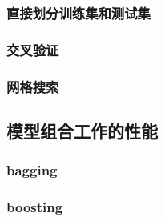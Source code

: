 \documentclass[12pt,a4paper]{article}
\theoremstyle{definition}
\begin{document}
\subsubsection{直接划分训练集和测试集}

\subsubsection{交叉验证}

\subsubsection{网格搜索}

\subsection{模型组合工作的性能}

\subsubsection{bagging}

\subsubsection{boosting}
\end{document}
